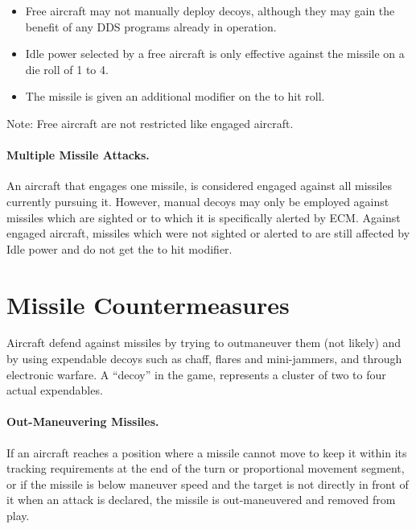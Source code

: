 \begin{itemize}


    \item Free aircraft may not manually deploy decoys, although they may gain the benefit of any DDS programs already in operation.

    \item Idle power selected by a free aircraft is only effective against the missile on a die roll of 1 to 4.

    \item The missile is given an additional  modifier on the to hit roll.

\end{itemize}

Note: Free aircraft are not restricted like engaged aircraft.

\paragraph{Multiple Missile Attacks.} An aircraft that engages one missile, is considered engaged against all missiles currently pursuing it. However, manual decoys may only be employed against missiles which are sighted or to which it is specifically alerted by ECM. Against engaged aircraft, missiles which were not sighted or alerted to are still affected by Idle power and do not get the  to hit modifier.

\section{Missile Countermeasures}
\label{rule:missile-countermeasures}

Aircraft defend against missiles by trying to outmaneuver them (not likely) and by using expendable decoys such as chaff, flares and mini-jammers, and through electronic warfare. A “decoy” in the game, represents a cluster of two to four actual expendables.

\paragraph{Out-Maneuvering Missiles.} If an aircraft reaches a position where a missile cannot move to keep it within its tracking requirements at the end of the turn or proportional movement segment, or if the missile is below maneuver speed and the target is not directly in front of it when an attack is declared, the missile is out-maneuvered and removed from play.

